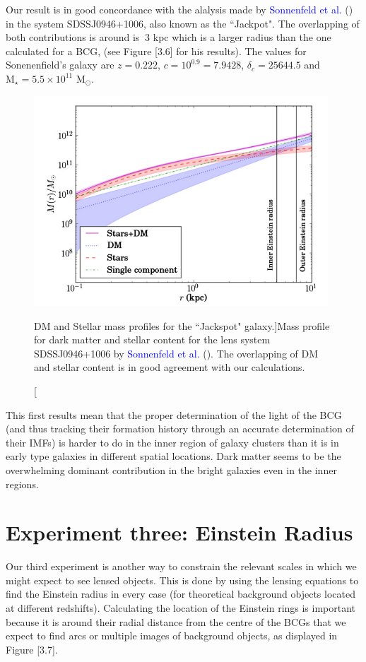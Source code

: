 Our result is in good concordance with the alalysis made by \textcolor{blue}{Sonnenfeld et al.} (\citeyear{Reference15}) in the system SDSSJ0946+1006, also known as the ``Jackpot". The overlapping of both contributions is around is $~3$ kpc which is a larger radius than the one calculated for a BCG, (see Figure [3.6] for his results). The values for Sonenenfield's galaxy are $z=0.222$, $c=10^{0.9}=7.9428$, $\delta_c=25644.5$ and $\text{M}_{\star}=5.5\times 10^{11}$ $\text{M}_{\odot}$.

\begin{figure}[H]
\centering
\includegraphics[width=11cm]{images/sonnenfeld_galaxy.png}
\caption[DM and Stellar mass profiles for the ``Jackspot" galaxy.]{Mass profile for dark matter and stellar content for the lens system SDSSJ0946+1006  by \textcolor{blue}{Sonnenfeld et al.} (\citeyear{Reference15}). The overlapping of DM and stellar content is in good agreement with our calculations.}
\end{figure}

This first results mean that the proper determination of the light of the BCG (and thus tracking their formation history through an accurate determination of their IMFs) is harder to do in the inner region of galaxy clusters than it is in early type galaxies in different spatial locations. Dark matter seems to be the overwhelming dominant contribution in the bright galaxies even in the inner regions.

\section{Experiment three: Einstein Radius}

Our third experiment is another way to constrain the relevant scales in which we might expect to see lensed objects. This is done by using the lensing equations to find the Einstein radius in every case (for theoretical background objects located at different redshifts). Calculating the location of the Einstein rings is important because it is around their radial distance from the centre of the BCGs that we expect to find arcs or multiple images of background objects, as displayed in Figure [3.7]. 

